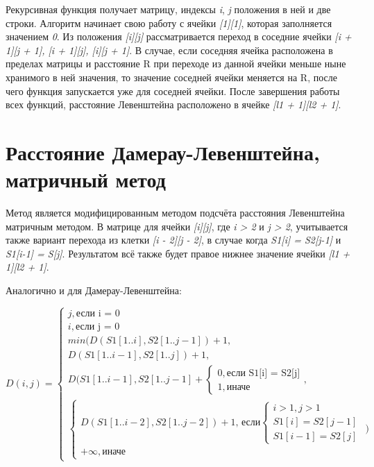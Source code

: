 \documentclass[12pt,a4paper]{report}
\begin{document}
Рекурсивная функция получает матрицу, индексы \textit{i}, \textit{j} положения в ней и две строки. Алгоритм начинает свою 
работу с ячейки \textit{[1][1]}, которая заполняется значением \textit{0}. Из положения \textit{[i][j]} рассматривается переход в 
соседние ячейки \textit{[i + 1][j + 1], [i + 1][j], [i][j + 1]}. В случае, если соседняя ячейка расположена в 
пределах матрицы и расстояние R при переходе из данной ячейки меньше ныне хранимого в ней значения, то 
значение соседней ячейки меняется на R, после чего функция запускается уже для соседней ячейки. После 
завершения работы всех функций, расстояние Левенштейна расположено в ячейке \textit{[l1 + 1][l2 + 1]}. 

\section{Расстояние Дамерау-Левенштейна, матричный метод}


Метод является модифицированным методом подсчёта расстояния Левенштейна матричным методом. В матрице
для ячейки \textit{[i][j]}, где \textit{i > 2} и \textit{j > 2}, учитывается также вариант перехода из клетки \textit{[i - 2][j - 2]}, в 
случае когда \textit{S1[i] = S2[j-1]} и \textit{S1[i-1] = S[j]}. Результатом всё также будет правое нижнее значение
ячейки \textit{[l1 + 1][l2 + 1]}. 

Аналогично и для Дамерау-Левенштейна:

\begin{displaymath}
	D(i, j) = \left\{
	\begin{array}{ll}
		j, \textrm{если i = 0} \\
		i, \textrm{если j = 0} \\
		min(D(S1[1..i], S2[1..j-1]) + 1,\\
		D(S1[1..i-1], S2[1..j]) + 1,\\
		D(S1[1..i-1], S2[1..j-1] + \left \{ 
		\begin{array}{ll}
			0, \textrm{если S1[i] = S2[j]} \\ 
			1, \textrm{иначе}
		\end{array} \right.
		, \\
		\left \{ \begin{array}{ll}
			D(S1[1..i-2], S2[1..j-2]) + 1 \textrm{, если} \left \{ 
			\begin{array}{ll}
				i > 1, j > 1 \\
				S1[i] = S2[j-1] \\
				S1[i-1] = S2[j]
			\end{array} \right. \\
			+\infty, \textrm{иначе}
		\end{array} \right. 
		)
	\end{array} \right.
\end{displaymath}
\end{document}
